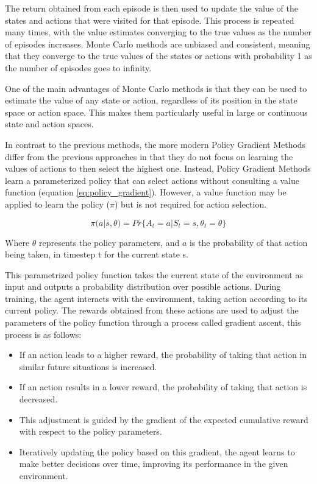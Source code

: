 The return obtained from each episode is then used to update the value of the states and actions that were visited for that episode. This process is repeated many times, with the value estimates converging to the true values as the number of episodes increases. Monte Carlo methods are unbiased and consistent, meaning that they converge to the true values of the states or actions with probability 1 as the number of episodes goes to infinity.

One of the main advantages of Monte Carlo methods is that they can be used to estimate the value of any state or action, regardless of its position in the state space or action space. This makes them particularly useful in large or continuous state and action spaces.

In contrast to the previous methods, the more modern Policy Gradient Methods differ from the previous approaches in that they do not focus on learning the values of actions to then select the highest one. Instead, Policy Gradient Methods learn a parameterized policy that can select actions without consulting a value function (equation \ref{eq:policy_gradient}). However, a value function may be applied to learn the policy ($\pi$) but is not required for action selection.

\begin{equation}
    \label{eq:policy_gradient}
    \pi(a|s,\theta) = Pr\{A_t=a | S_t=s, \theta_t=\theta\}
\end{equation}

Where $\theta$ represents the policy parameters, and $a$ is the probability of that action being taken, in timestep t for the current state s.

This parametrized policy function takes the current state of the environment as input and outputs a probability distribution over possible actions. During training, the agent interacts with the environment, taking action according to its current policy. The rewards obtained from these actions are used to adjust the parameters of the policy function through a process called gradient ascent, this process is as follows:

\begin{itemize}
    \item If an action leads to a higher reward, the probability of taking that action in similar future situations is increased.
    \item If an action results in a lower reward, the probability of taking that action is decreased.
    \item This adjustment is guided by the gradient of the expected cumulative reward with respect to the policy parameters.
    \item Iteratively updating the policy based on this gradient, the agent learns to make better decisions over time, improving its performance in the given environment.
\end{itemize}

